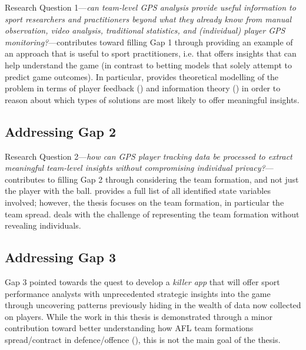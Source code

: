 Research Question 1---\textit{can team-level GPS analysis provide useful information to sport researchers and practitioners beyond what they already know from manual observation, video analysis, traditional statistics, and (individual) player GPS monitoring?}---contributes toward filling Gap 1 through providing an example of an approach that is useful to sport practitioners, i.e. that offers insights that can help understand the game (in contrast to betting models that solely attempt to predict game outcomes). In particular,  provides theoretical modelling of the problem in terms of player feedback () and information theory () in order to reason about which types of solutions are most likely to offer meaningful insights.

\subsection*{Addressing Gap 2}

Research Question 2---\textit{how can GPS player tracking data be processed to extract meaningful team-level insights without compromising individual privacy?}---contributes to filling Gap 2 through considering the team formation, and not just the player with the ball.  provides a full list of all identified state variables involved; however, the thesis focuses on the team formation, in particular the team spread.  deals with the challenge of representing the team formation without revealing individuals.


\subsection*{Addressing Gap 3}

Gap 3 pointed towards the quest to develop a \textit{killer app} that will offer sport performance analysts with unprecedented strategic insights into the game through uncovering patterns previously hiding in the wealth of data now collected on players. While the work in this thesis is demonstrated through a minor contribution toward better understanding how AFL team formations spread/contract in defence/offence (), this is not the main goal of the thesis.

